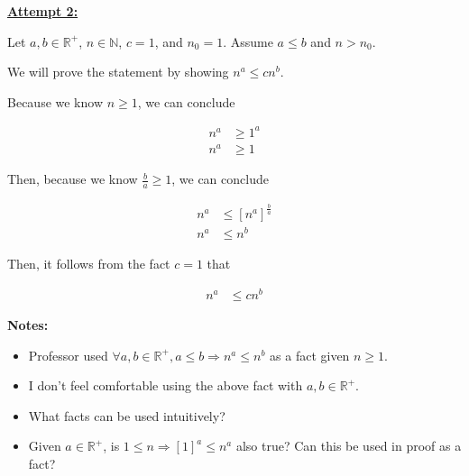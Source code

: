 \documentclass[12pt]{article}
\begin{document}
\begin{enumerate}[a.]
    \bigskip

    \begin{mdframed}
        \underline{\textbf{Attempt 2:}}

        \bigskip

        Let $a,b \in \mathbb{R}^{+}$, $n \in \mathbb{N}$, $c = 1$, and $n_0 = 1$. Assume
        $a \leq b$ and $n > n_0$.

        \bigskip

        We will prove the statement by showing $n^a \leq cn^b$.

        \bigskip
        \color{red}
        Because we know $n \geq 1$, we can conclude

        \setcounter{equation}{0}
        \begin{align}
            n^a &\geq 1^a\\
            n^a &\geq 1
        \end{align}

        \bigskip

        Then, because we know $\frac{b}{a} \geq 1$, we can conclude

        \begin{align}
            n^a &\leq \left[ n^a \right]^{\frac{b}{a}}\\
            n^a &\leq n^b
        \end{align}

        \color{black}

        \bigskip

        Then, it follows from the fact $c = 1$ that

        \begin{align}
            n^a &\leq cn^b
        \end{align}

    \end{mdframed}

    \bigskip

    \textbf{Notes:}

    \begin{itemize}
        \item Professor used $\forall a,b \in \mathbb{R}^{+},
        a \leq b \Rightarrow n^a \leq n^b$ as a fact given $n \geq 1$.
        \item I don't feel comfortable using the above fact with $a,b \in \mathbb{R}^{+}$.
        \item What facts can be used intuitively?
        \item Given $a \in \mathbb{R}^{+}$, is $1 \leq n \Rightarrow [1]^a \leq n^a$
        also true? Can this be used in proof as a fact?

    \end{itemize}

\end{enumerate}
\end{document}
